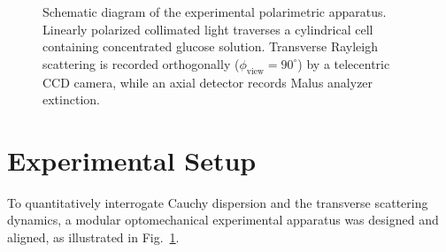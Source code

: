 \documentclass[twocolumn,10pt,a4paper]{article}
\begin{document}
\begin{figure}[t]
  \caption{Schematic diagram of the experimental polarimetric apparatus. Linearly polarized collimated light traverses a cylindrical cell containing concentrated glucose solution. Transverse Rayleigh scattering is recorded orthogonally ($\phi_{\text{view}} = 90^\circ$) by a telecentric CCD camera, while an axial detector records Malus analyzer extinction.}
  \label{fig:experimental_setup}
\end{figure}

\section{Experimental Setup}

To quantitatively interrogate Cauchy dispersion and the transverse scattering dynamics, a modular optomechanical experimental apparatus was designed and aligned, as illustrated in Fig.~\ref{fig:experimental_setup}.
\end{document}
